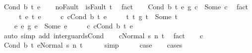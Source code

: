 \begin{isabellebody}
\ {\isacharparenleft}Cond\ b\ t{}\ e{}{\isacharparenright}\isanewline
\ \ \isamarkupfalse%
\ noFault{\isacharcolon}\ {\isachardoublequoteopen}{\isasymnot}\ isFault\ t{\isachardoublequoteclose}\ \isamarkupfalse%
\ fact\isanewline
\ \ \isamarkupfalse%
\ {\isachardoublequoteopen}{\isacharparenleft}Cond\ b\ t{}\ e{}\ {\isasyminter}\isactrlsub g\ c{}{\isacharparenright}\ {\isacharequal}\ Some\ c{\isachardoublequoteclose}\ \isamarkupfalse%
\ fact\isanewline
\ \ \isamarkupfalse%
\ \isamarkupfalse%
\ t{}\ e{}\ t{}\ e{}\ \isanewline
\ \ \ \ c{}{\isacharcolon}\ {\isachardoublequoteopen}c{}{\isacharequal}Cond\ b\ t{}\ e{}{\isachardoublequoteclose}\ \isanewline
\ \ \ \ t{}{\isacharcolon}\ {\isachardoublequoteopen}{\isacharparenleft}t{}\ {\isasyminter}\isactrlsub g\ t{}{\isacharparenright}\ {\isacharequal}\ Some\ t{}{\isachardoublequoteclose}\ \isanewline
\ \ \ \ e{}{\isacharcolon}\ {\isachardoublequoteopen}{\isacharparenleft}e{}\ {\isasyminter}\isactrlsub g\ e{}{\isacharparenright}\ {\isacharequal}\ Some\ e{}{\isachardoublequoteclose}\ \isanewline
\ \ \ \ c{\isacharcolon}\ {\isachardoublequoteopen}c{\isacharequal}Cond\ b\ t{}\ e{}{\isachardoublequoteclose}\isanewline
\ \ \ \ \isamarkupfalse%
\ {\isacharparenleft}auto\ simp\ add{\isacharcolon}\ inter{\isacharunderscore}guards{\isacharunderscore}Cond{\isacharparenright}\isanewline
\ \ \isamarkupfalse%
\ {\isachardoublequoteopen}{\isasymGamma}{\isasymturnstile}{\isasymlangle}c{\isacharcomma}Normal\ s{\isasymrangle}\ {\isacharequal}n{\isasymRightarrow}\ t{\isachardoublequoteclose}\ \isamarkupfalse%
\ fact\isanewline
\ \ \isamarkupfalse%
\ c\ \isamarkupfalse%
\ {\isachardoublequoteopen}{\isasymGamma}{\isasymturnstile}{\isasymlangle}Cond\ b\ t{}\ e{}{\isacharcomma}Normal\ s{\isasymrangle}\ {\isacharequal}n{\isasymRightarrow}\ t{\isachardoublequoteclose}\isanewline
\ \ \ \ \isamarkupfalse%
\ simp\isanewline
\ \ \isamarkupfalse%
\ \isamarkupfalse%
\ {\isacharquery}case\isanewline
\ \ \isamarkupfalse%
\ {\isacharparenleft}cases{\isacharparenright}\isanewline

\end{isabellebody}
